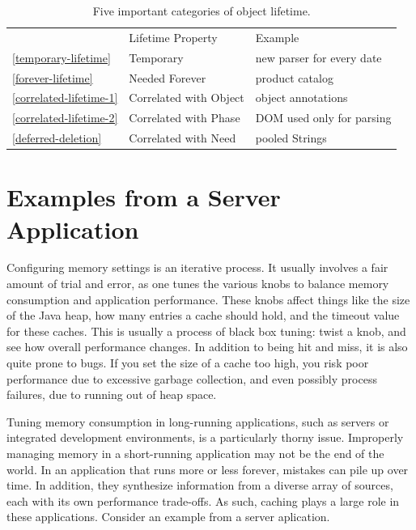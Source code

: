 \begin{table}
\centering
	\begin{tabular}{lp{}p{}}
	\toprule  & Lifetime Property & Example \\ \cmidrule(r){2-2} \cmidrule(l){3-3}
	\autoref{temporary-lifetime}  & {Temporary} & new
	parser for every date
	\\
	\autoref{forever-lifetime} & {Needed Forever} & product catalog
	\\
	\autoref{correlated-lifetime-1} & {Correlated with Object}
	& object annotations
	\\
	\autoref{correlated-lifetime-2} & {Correlated with Phase} &
	DOM used only for parsing
	\\
	\autoref{deferred-deletion} & {Correlated with Need} &
	pooled Strings \\
	\bottomrule
	\end{tabular}
	\caption{Five important categories of object lifetime.}
	\label{tab:five-lifetimes}
\end{table}

\section{Examples from a Server Application}

Configuring memory settings is an iterative process. It usually involves a
fair amount of trial and error, as one tunes the various knobs to balance memory
consumption and application performance. These knobs affect things like the size of the Java
heap, how many entries a cache should hold, and the timeout value for these
caches. This is usually a process of black box tuning: twist a knob, and see
how overall performance changes. In addition to being hit
and miss, it is also quite prone to bugs. If you set the size of a cache too
high, you risk poor performance due to excessive garbage collection, and even
possibly process failures, due to running out of heap space.

Tuning memory consumption in long-running applications, such as servers or
integrated development environments, is a particularly thorny issue. Improperly
managing memory in a short-running application may not be the end of the world.
In an application that runs more or less forever, mistakes can pile up over time.
In addition, they synthesize information from a diverse array of sources, each
with its own performance trade-offs. As such, caching plays a large role in these
applications. Consider an example from a server aplication.

